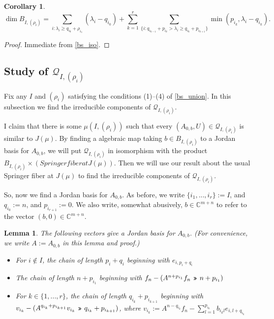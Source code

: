 \documentclass[12pt,psamsfonts]{article}
\newcommand{\leftshift}{\,\texttt{<<}\,}
\newcommand{\rightshift}{\mathbin{\rotatebox[origin=c]{180}{\leftshift}}}
\newtheorem{lemma}[theorem]{Lemma}
\newtheorem{corollary}[theorem]{Corollary}
\begin{document}
\begin{corollary}\label{bs_dim}
    \[\dim B_{I, (\rho_i)} = \sum_{i : \lambda_i \geq q_{i_0} + \rho_{i_1}} (\lambda_i - q_{i_0}) + \sum_{k = 1}^r \sum_{\{i : q_{i_{k - 1}} + p_{i_k} > \lambda_i \geq q_{i_k} + p_{i_{k + 1}}\}} \min(p_{i_k}, \lambda_i - q_{i_k}).\]
\end{corollary}
\begin{proof}
    Immediate from \cref{bs_iso}.
\end{proof}

\subsection{Study of \texorpdfstring{\(\mathcal{Q}_{I, (\rho_i)}\)}{Q\_\{I, (p\_i)\}}}
Fix any \(I\) and \((\rho_i)\) satisfying the conditions (1)--(4) of \cref{bs_union}.
In this subsection we find the irreducible components of \(\mathcal{Q}_{I, (\rho_i)}\).
\par I claim that there is some \(\mu(I, (\rho_i))\) such that every \((A_{0, b}, U) \in \mathcal{Q}_{I, (\rho_i)}\) is similar to \(J(\mu)\).
By finding a algebraic map taking \(b \in B_{I, (\rho_i)}\) to a Jordan basis for \(A_{0,b}\), we will put \(\mathcal{Q}_{I, (\rho_i)}\) in isomorphism with the product \(B_{I, (\rho_i)} \times (Springer fiber at J(\mu))\).
Then we will use our result about the usual Springer fiber at \(J(\mu)\) to find the irreducible components of \(\mathcal{Q}_{I, (\rho_i)}\).
\par So, now we find a Jordan basis for \(A_{0, b}\).
As before, we write \(\{i_1, ..., i_r\} := I\), and \(q_{i_0} := n\), and \(p_{i_{r + 1}} := 0\).
We also write, somewhat abusively, \(b \in \mathbb{C}^{m + n}\) to refer to the vector \((b, 0) \in \mathbb{C}^{m + n}\).
\begin{lemma}
    The following vectors give a Jordan basis for \(A_{0,b}\).
    (For convenience, we write \(A := A_{0,b}\) in this lemma and proof.)
    \begin{itemize}
        \item For \(i \notin I\), the chain of length \(p_i + q_i\) beginning with \(e_{i, p_i + q_i}\)
        \item The chain of length \(n + p_{i_1}\) beginning with \(f_n - (A^{n + p_{i_1}}f_n \rightshift n + p_{i_1})\)
        \item For \(k \in \{1, ..., r\}\), the chain of length \(q_{i_k} + p_{i_{k + 1}}\) beginning with \(v_{i_k} - (A^{q_{i_k} + p_{i_{k + 1}}} v_{i_k} \rightshift q_{i_k} + p_{i_{k + 1}})\), where \(v_{i_k} := A^{n - q_{i_k}} f_n - \sum_{l = 1}^{p_{i_k}} b_{i_kl} e_{i,l + q_{i_k}}\)
    \end{itemize}
\end{lemma}
\end{document}

